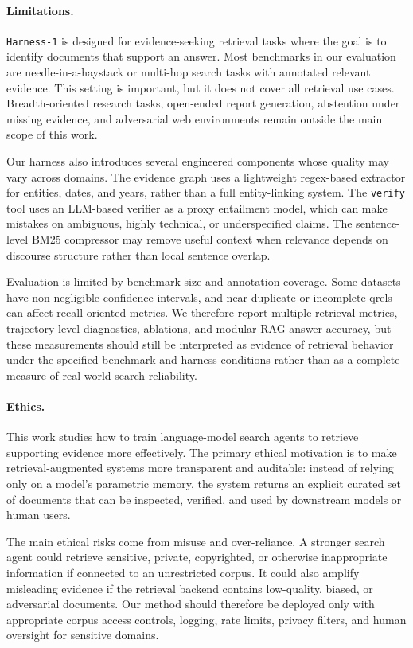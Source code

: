 \documentclass{article}
\newcommand{\sys}{\texttt{Harness-1}\xspace}
\newcommand{\verify}{\texttt{verify}\xspace}
\begin{document}
\paragraph{Limitations.}
\sys is designed for evidence-seeking retrieval tasks where the goal is to
identify documents that support an answer. Most benchmarks in our evaluation are
needle-in-a-haystack or multi-hop search tasks with annotated relevant evidence.
This setting is important, but it does not cover all retrieval use cases.
Breadth-oriented research tasks, open-ended report generation, abstention under
missing evidence, and adversarial web environments remain outside the main scope
of this work.

Our harness also introduces several engineered components whose quality may vary
across domains. The evidence graph uses a lightweight regex-based extractor for
entities, dates, and years, rather than a full entity-linking system. The
\verify tool uses an LLM-based verifier as a proxy entailment model, which can
make mistakes on ambiguous, highly technical, or underspecified claims. The
sentence-level BM25 compressor may remove useful context when relevance depends
on discourse structure rather than local sentence overlap.

Evaluation is limited by benchmark size and annotation coverage. Some datasets
have non-negligible confidence intervals, and near-duplicate or incomplete qrels
can affect recall-oriented metrics. We therefore report multiple retrieval
metrics, trajectory-level diagnostics, ablations, and modular RAG answer
accuracy, but these measurements should still be interpreted as evidence of
retrieval behavior under the specified benchmark and harness conditions rather
than as a complete measure of real-world search reliability.

\paragraph{Ethics.}
This work studies how to train language-model search agents to retrieve
supporting evidence more effectively. The primary ethical motivation is to make
retrieval-augmented systems more transparent and auditable: instead of relying
only on a model's parametric memory, the system returns an explicit curated set
of documents that can be inspected, verified, and used by downstream models or
human users.

The main ethical risks come from misuse and over-reliance. A stronger search
agent could retrieve sensitive, private, copyrighted, or otherwise inappropriate
information if connected to an unrestricted corpus. It could also amplify
misleading evidence if the retrieval backend contains low-quality, biased, or
adversarial documents. Our method should therefore be deployed only with
appropriate corpus access controls, logging, rate limits, privacy filters, and
human oversight for sensitive domains.
\end{document}
